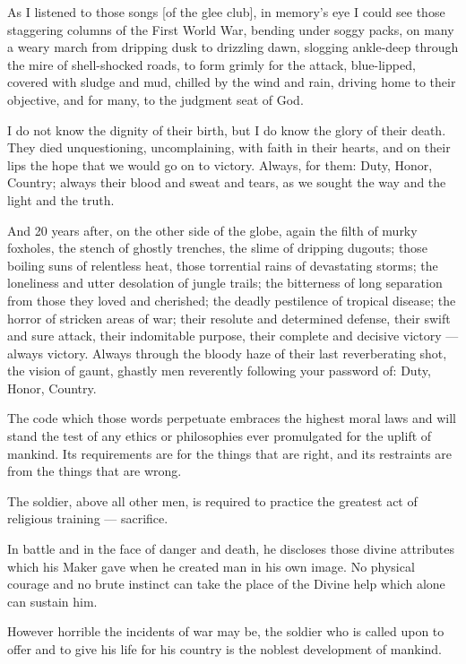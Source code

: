 \documentclass[a4paper]{amsbook}
\begin{document}
As I listened to those songs [of the glee club], in memory's eye I could see those staggering columns of the First World War, bending under soggy packs, on many a weary march from dripping dusk to drizzling dawn, slogging ankle-deep through the mire of shell-shocked roads, to form grimly for the attack, blue-lipped, covered with sludge and mud, chilled by the wind and rain, driving home to their objective, and for many, to the judgment seat of  God.

I do not know the dignity of their birth, but I do know the glory of their death. They died unquestioning, uncomplaining, with faith in their hearts, and on their lips the hope that we would go on to victory. Always, for them: Duty, Honor, Country; always their blood and sweat and tears, as we sought the way and the light and the truth.

And 20 years after, on the other side of the globe, again the filth of murky foxholes, the stench of ghostly trenches, the slime of dripping dugouts; those boiling suns of relentless heat, those torrential rains of devastating storms; the loneliness and utter desolation of jungle trails; the bitterness of long separation from those they loved and cherished; the deadly pestilence of tropical disease; the horror of stricken areas of war; their resolute and determined defense, their swift and sure attack, their indomitable purpose, their complete and decisive victory — always victory. Always through the bloody haze of their last reverberating shot, the vision of gaunt, ghastly men reverently following your password of: Duty, Honor, Country.

The code which those words perpetuate embraces the highest moral laws and will stand the test of any ethics or philosophies ever promulgated for the uplift of mankind. Its requirements are for the things that are right, and its restraints are from the things that are wrong.

The soldier, above all other men, is required to practice the greatest act of religious training — sacrifice.

In battle and in the face of danger and death, he discloses those divine attributes which his Maker gave when he created man in his own image. No physical courage and no brute instinct can take the place of the Divine help which alone can sustain him.

However horrible the incidents of war may be, the soldier who is called upon to offer and to give his life for his country is the noblest development of mankind.
\end{document}
